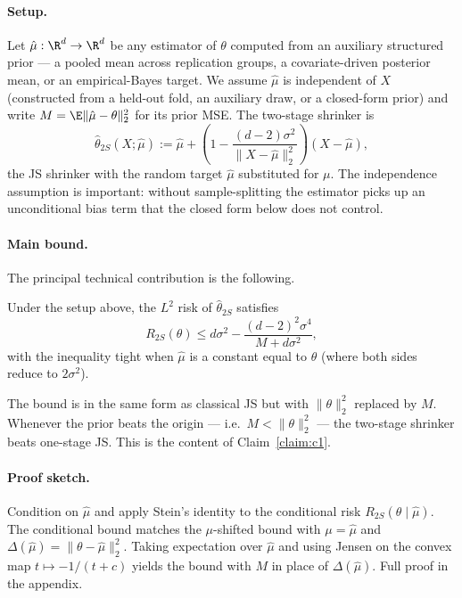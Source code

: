 \documentclass{rrxiv}
\begin{document}
\paragraph{Setup.} Let $\hat\mu : \R^d \to \R^d$ be any
estimator of $\theta$ computed from an auxiliary structured prior --- a
pooled mean across replication groups, a covariate-driven posterior mean,
or an empirical-Bayes target. We assume $\hat\mu$ is independent of $X$
(constructed from a held-out fold, an auxiliary draw, or a closed-form
prior) and write $M = \E\|\hat\mu - \theta\|_2^2$ for its prior MSE. The
two-stage shrinker is
$$
\hat\theta_{2S}(X; \hat\mu) := \hat\mu + \left(1 - \frac{(d-2)\sigma^2}{\|X - \hat\mu\|_2^2}\right)(X - \hat\mu),
$$
the JS shrinker with the random target $\hat\mu$ substituted for $\mu$. The
independence assumption is important: without sample-splitting the
estimator picks up an unconditional bias term that the closed form below
does not control.

\paragraph{Main bound.} The principal technical contribution is the
following.
\begin{rrxivremark}
\label{rem:thm-31}
Under the setup above, the $L^2$ risk of $\hat\theta_{2S}$ satisfies
$$
R_{2S}(\theta) \leq d\sigma^2 - \frac{(d-2)^2\sigma^4}{M + d\sigma^2},
$$
with the inequality tight when $\hat\mu$ is a constant equal to $\theta$
(where both sides reduce to $2\sigma^2$).
\end{rrxivremark}

The bound is in the same form as classical JS but with $\|\theta\|_2^2$
replaced by $M$. Whenever the prior beats the origin --- i.e.\ $M <
\|\theta\|_2^2$ --- the two-stage shrinker beats one-stage JS. This is the
content of Claim~\ref{claim:c1}.

\paragraph{Proof sketch.} Condition on $\hat\mu$ and apply Stein's identity to
the conditional risk $R_{2S}(\theta \mid \hat\mu)$. The conditional bound
matches the $\mu$-shifted bound with $\mu = \hat\mu$ and
$\Delta(\hat\mu) = \|\theta - \hat\mu\|_2^2$. Taking expectation over
$\hat\mu$ and using Jensen on the convex map $t \mapsto -1/(t + c)$ yields
the bound with $M$ in place of $\Delta(\hat\mu)$. Full proof in the
appendix.
\end{document}
